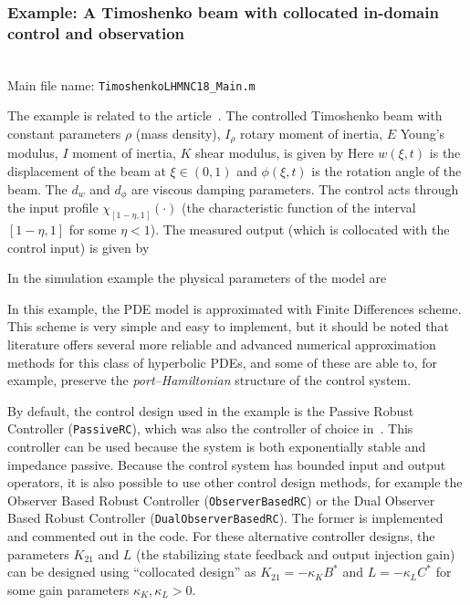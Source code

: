 \documentclass[11pt, a4paper]{amsart}
\theoremstyle{definition}
\numberwithin{equation}{section}
\begin{document}
\medskip

\subsubsection*{Example: A Timoshenko beam with collocated in-domain control and observation}
~\\[-1ex]

\noindent Main file name: \texttt{TimoshenkoLHMNC18\_Main.m}

\medskip

The example is related to the article~\cite{PauLeG22}.
The controlled Timoshenko beam with constant parameters $\rho$ (mass density), $I_\rho$ rotary moment of inertia, $E$  Young's modulus, $I$ moment of inertia, $K$ shear modulus, is given by
Here $w(\xi,t)$ is the displacement of the beam at $\xi\in(0,1)$ and $\phi(\xi,t)$ is the rotation angle of the beam. The $d_w$ and $d_\phi$ are viscous damping parameters. 
The control acts through the input profile $\chi_{[1-\eta,1]}(\cdot)$ (the characteristic function of the interval $[1-\eta,1]$ for some $\eta<1$).
The measured output (which is collocated with the control input) is given by

In the simulation example the physical parameters of the model are 

In this example, the PDE model is approximated with Finite Differences scheme. This scheme is very simple and easy to implement, but it should be noted that literature offers several more reliable and advanced numerical approximation methods for this class of hyperbolic PDEs, and some of these are able to, for example, preserve the \emph{port--Hamiltonian} structure of the control system.

By default, the control design used in the example is the Passive Robust Controller (\texttt{PassiveRC}), which was also the controller of choice in~\cite{PauLeGLHMNC18}. This controller can be used because the system is both exponentially stable and impedance passive.
Because the control system has bounded input and output operators, it is also possible to use other control design methods, for example the Observer Based Robust Controller (\texttt{ObserverBasedRC}) or the Dual Observer Based Robust Controller (\texttt{DualObserverBasedRC}). The former is implemented and commented out in the code. For these alternative controller designs, the parameters $K_{21}$ and $L$ (the stabilizing state feedback and output injection gain) can be designed using ``collocated design'' as $K_{21} = -\kappa_K B^\ast$ and $L=-\kappa_L C^\ast$ for some gain parameters $\kappa_K,\kappa_L>0$.
\end{document}
